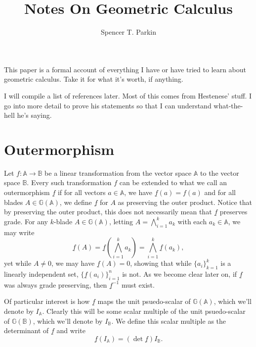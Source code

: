 \documentclass[12pt]{article}
\title{Notes On Geometric Calculus}
\author{Spencer T. Parkin}
\newcommand{\G}{\mathbb{G}}
\newcommand{\A}{\mathbb{A}}
\newcommand{\B}{\mathbb{B}}
\newcommand{\ub}{\underline}
\begin{document}
\maketitle

This paper is a formal account of everything I have or have tried
to learn about geometric calculus.  Take it for what it's worth, if anything.

I will compile a list of references later.  Most of this comes from Hestenese' stuff.
I go into more detail to prove his statements so that I can understand what-the-hell
he's saying.

\section{Outermorphism}

Let $f:\A\to\B$ be a linear transformation from the vector space $\A$
to the vector space $\B$.  Every such transformation $f$ can be
extended to what we call an outermorphism $\ub{f}$ if for all
vectors $a\in\A$, we have $\ub{f}(a)=f(a)$ and for all blades $A\in\G(\A)$,
we define $\ub{f}$ for $A$ as preserving the outer product.
Notice that by preserving the outer product, this does not necessarily
mean that $\ub{f}$ preserves grade.
For any $k$-blade $A\in\G(\A)$, letting $A=\bigwedge_{i=1}^k a_k$ with
each $a_k\in\A$, we may write
\begin{equation*}
\ub{f}(A)=\ub{f}\left(\bigwedge_{i=1}^k a_k\right) = \bigwedge_{i=1}^k\ub{f}(a_k),
\end{equation*}
yet while $A\neq 0$, we may have $\ub{f}(A)=0$, showing that while $\{a_i\}_{k=1}^k$
is a linearly independent set, $\{\ub{f}(a_i)\}_{i=1}^n$ is not.  As we become clear
later on, if $\ub{f}$ was always grade preserving, then $\ub{f}^{-1}$ must exist.

Of particular interest is how $\ub{f}$ maps the
unit psuedo-scalar of $\G(\A)$, which we'll denote by $I_{\A}$.  Clearly this
will be some scalar multiple of the unit psuedo-scalar of $\G(\B)$, which we'll
denote by $I_{\B}$.  We define this scalar multiple as the determinant of $\ub{f}$
and write
\begin{equation*}
\ub{f}(I_{\A}) = \left(\det\ub{f}\right)I_{\B}.
\end{equation*}
\end{document}
